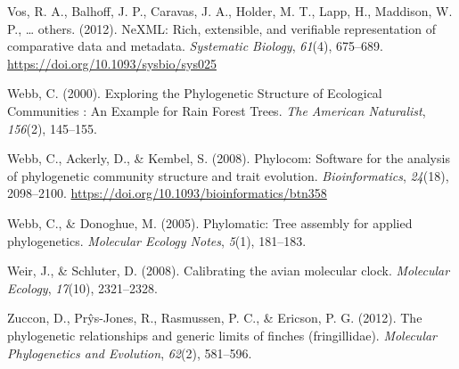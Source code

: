 \documentclass[english,man]{apa6}
\begin{document}
\leavevmode\hypertarget{ref-vos2012nexml}{}%
Vos, R. A., Balhoff, J. P., Caravas, J. A., Holder, M. T., Lapp, H., Maddison, W. P., \ldots{} others. (2012). NeXML: Rich, extensible, and verifiable representation of comparative data and metadata. \emph{Systematic Biology}, \emph{61}(4), 675--689. \url{https://doi.org/10.1093/sysbio/sys025}

\leavevmode\hypertarget{ref-Webb2000}{}%
Webb, C. (2000). Exploring the Phylogenetic Structure of Ecological Communities : An Example for Rain Forest Trees. \emph{The American Naturalist}, \emph{156}(2), 145--155.

\leavevmode\hypertarget{ref-Webb2008}{}%
Webb, C., Ackerly, D., \& Kembel, S. (2008). Phylocom: Software for the analysis of phylogenetic community structure and trait evolution. \emph{Bioinformatics}, \emph{24}(18), 2098--2100. \url{https://doi.org/10.1093/bioinformatics/btn358}

\leavevmode\hypertarget{ref-webb2005phylomatic}{}%
Webb, C., \& Donoghue, M. (2005). Phylomatic: Tree assembly for applied phylogenetics. \emph{Molecular Ecology Notes}, \emph{5}(1), 181--183.

\leavevmode\hypertarget{ref-weir2008calibrating}{}%
Weir, J., \& Schluter, D. (2008). Calibrating the avian molecular clock. \emph{Molecular Ecology}, \emph{17}(10), 2321--2328.

\leavevmode\hypertarget{ref-zuccon2012phylogenetic}{}%
Zuccon, D., Prŷs-Jones, R., Rasmussen, P. C., \& Ericson, P. G. (2012). The phylogenetic relationships and generic limits of finches (fringillidae). \emph{Molecular Phylogenetics and Evolution}, \emph{62}(2), 581--596.

\endgroup
\end{document}
